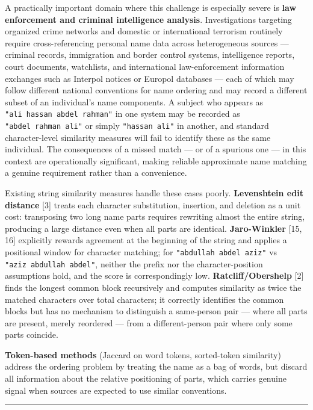 \documentclass[
  11pt,
]{article}
\begin{document}
A practically important domain where this challenge is especially severe
is \textbf{law enforcement and criminal intelligence analysis}.
Investigations targeting organized crime networks and domestic or
international terrorism routinely require cross-referencing personal
name data across heterogeneous sources --- criminal records, immigration
and border control systems, intelligence reports, court documents,
watchlists, and international law-enforcement information exchanges such
as Interpol notices or Europol databases --- each of which may follow
different national conventions for name ordering and may record a
different subset of an individual's name components. A subject who
appears as \texttt{"ali\ hassan\ abdel\ rahman"} in one system may be
recorded as \texttt{"abdel\ rahman\ ali"} or simply
\texttt{"hassan\ ali"} in another, and standard character-level
similarity measures will fail to identify these as the same individual.
The consequences of a missed match --- or of a spurious one --- in this
context are operationally significant, making reliable approximate name
matching a genuine requirement rather than a convenience.

Existing string similarity measures handle these cases poorly.
\textbf{Levenshtein edit distance} {[}3{]} treats each character
substitution, insertion, and deletion as a unit cost: transposing two
long name parts requires rewriting almost the entire string, producing a
large distance even when all parts are identical. \textbf{Jaro-Winkler}
{[}15, 16{]} explicitly rewards agreement at the beginning of the string
and applies a positional window for character matching; for
\texttt{"abdullah\ abdel\ aziz"} vs \texttt{"aziz\ abdullah\ abdel"},
neither the prefix nor the character-position assumptions hold, and the
score is correspondingly low. \textbf{Ratcliff/Obershelp} {[}2{]} finds
the longest common block recursively and computes similarity as twice
the matched characters over total characters; it correctly identifies
the common blocks but has no mechanism to distinguish a same-person pair
--- where all parts are present, merely reordered --- from a
different-person pair where only some parts coincide.

\textbf{Token-based methods} (Jaccard on word tokens, sorted-token
similarity) address the ordering problem by treating the name as a bag
of words, but discard all information about the relative positioning of
parts, which carries genuine signal when sources are expected to use
similar conventions.

\begin{center}\rule{0.5\linewidth}{0.5pt}\end{center}
\end{document}
